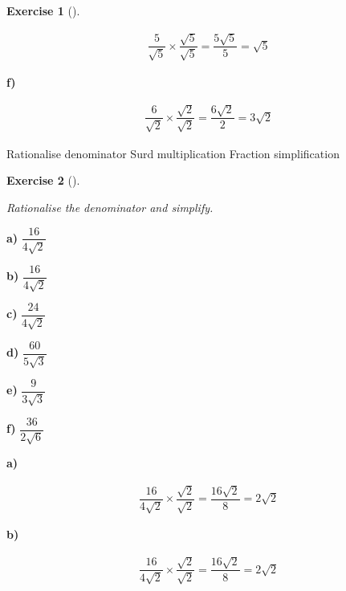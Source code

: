 \documentclass[
  letterpaper,
  DIV=11,
  numbers=noendperiod]{scrreprt}
\theoremstyle{definition}
\newtheorem{exercise}{Exercise}[chapter]
\theoremstyle{remark}
\begin{document}
\begin{exercise}[]
\begin{tcolorbox}
\[
\begin{aligned}
\dfrac{5}{\sqrt{5}}\times\dfrac{\sqrt{5}}{\sqrt{5}}=\dfrac{5\sqrt{5}}{5}=\sqrt{5}
\end{aligned}
\]

\textbf{f)}

\[
\begin{aligned}
\dfrac{6}{\sqrt{2}}\times\dfrac{\sqrt{2}}{\sqrt{2}}=\dfrac{6\sqrt{2}}{2}=3\sqrt{2}
\end{aligned}
\]

\end{tcolorbox}

{Rationalise denominator} {Surd multiplication} {Fraction
simplification}

\end{exercise}

\begin{exercise}[]\protect\hypertarget{exr-u2-52}{}\label{exr-u2-52}

\emph{Rationalise the denominator and simplify.}

\textbf{a)} \(\displaystyle \dfrac{16}{4\sqrt{2}}\)

\textbf{b)} \(\displaystyle \dfrac{16}{4\sqrt{2}}\)

\textbf{c)} \(\displaystyle \dfrac{24}{4\sqrt{2}}\)

\textbf{d)} \(\displaystyle \dfrac{60}{5\sqrt{3}}\)

\textbf{e)} \(\displaystyle \dfrac{9}{3\sqrt{3}}\)

\textbf{f)} \(\displaystyle \dfrac{36}{2\sqrt{6}}\)

\begin{tcolorbox}[enhanced jigsaw, opacitybacktitle=0.6, coltitle=black, arc=.35mm, colframe=quarto-callout-tip-color-frame, colback=white, bottomrule=.15mm, left=2mm, colbacktitle=quarto-callout-tip-color!10!white, titlerule=0mm, opacityback=0, title=\textcolor{quarto-callout-tip-color}{\faLightbulb}\hspace{0.5em}{🔍 View Solutions}, leftrule=.75mm, breakable, rightrule=.15mm, bottomtitle=1mm, toptitle=1mm, toprule=.15mm]

\textbf{a)}

\[
\begin{aligned}
\dfrac{16}{4\sqrt{2}}\times\dfrac{\sqrt{2}}{\sqrt{2}}=\dfrac{16\sqrt{2}}{8}=2\sqrt{2}
\end{aligned}
\]

\textbf{b)}

\[
\begin{aligned}
\dfrac{16}{4\sqrt{2}}\times\dfrac{\sqrt{2}}{\sqrt{2}}=\dfrac{16\sqrt{2}}{8}=2\sqrt{2}
\end{aligned}
\]


\end{tcolorbox}
\end{exercise}
\end{document}
